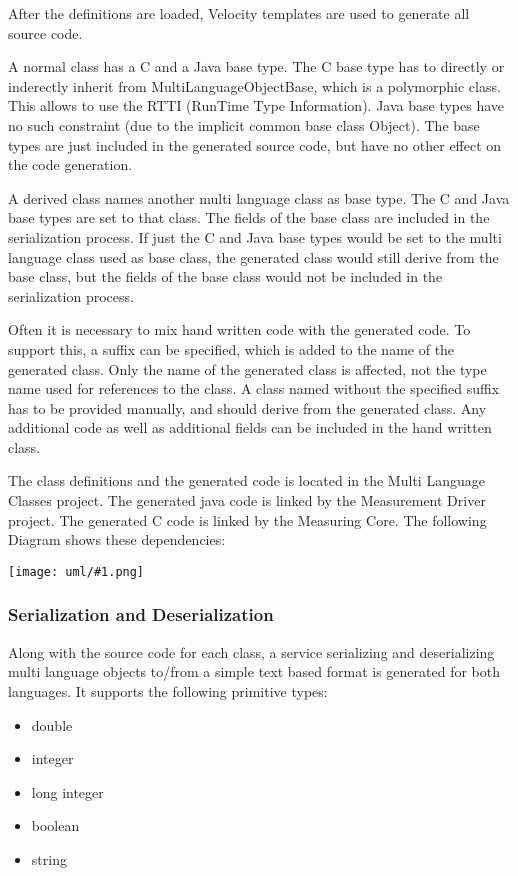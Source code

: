 \documentclass[a4paper,12pt]{article}
\newcommand{\umlDiagram}[1]{\begin{center}\texttt{[image: uml/\#1.png]}\end{center}}
\begin{document}
After the definitions are loaded, Velocity templates are used to generate all source code.

A normal class has a C and a Java base type. The C base type has to directly or inderectly inherit from MultiLanguageObjectBase, which is a polymorphic class. This allows to use the RTTI (RunTime Type Information). Java base types have no such constraint (due to the implicit common base class Object). The base types are just included in the generated source code, but have no other effect on the code generation.

A derived class names another multi language class as base type. The C and Java base types are set to that class. The fields of the base class are included in the serialization process. If just the C and Java base types would be set to the multi language class used as base class, the generated class would still derive from the base class, but the fields of the base class would not be included in the serialization process.

Often it is necessary to mix hand written code with the generated code. To support this, a suffix can be specified, which is added to the name of the generated class. Only the name of the generated class is affected, not the type name used for references to the class. A class named without the specified suffix has to be provided manually, and should derive from the generated class. Any additional code as well as additional fields can be included in the hand written class.

The class definitions and the generated code is located in the Multi Language Classes project. The generated java code is linked by the Measurement Driver project. The generated C code is linked by the Measuring Core. The following Diagram shows these dependencies:

\umlDiagram{CodeGenerationDependencies}

\subsubsection{Serialization and Deserialization}
Along with the source code for each class, a service serializing and deserializing multi language objects to/from a simple text based format is generated for both languages. It supports the following primitive types:
\begin{itemize}
\item double
\item integer
\item long integer
\item boolean
\item string
\end{itemize}
\end{document}
